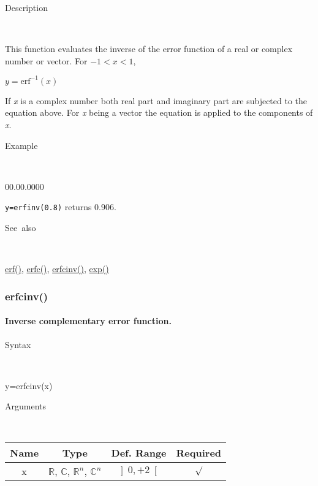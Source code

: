 \begin{description}
\item [Description]~
\end{description}
This function evaluates the inverse of the error function of a real
or complex number or vector. For $-1<x<1$,

\medskip{}
$y=\mathit{\mathrm{erf^{-1}}}(x)$
\medskip{}

\noindent If \textit{x} is a complex number both real part and imaginary
part are subjected to the equation above. For \textit{x} being a vector
the equation is applied to the components of \textit{x}.

\begin{description}
\item [Example]~
\end{description}
\begin{lyxlist}{00.00.0000}
\item [\texttt{y=erfinv(0.8)}]returns 0.906.
\end{lyxlist}
\begin{description}
\item [See~also]~
\end{description}
\textcolor{blue}{\hyperlink{erf}{erf()}}\textcolor{black}{,} \textcolor{blue}{\hyperlink{erfc}{erfc()}}\textcolor{black}{,}
\textcolor{blue}{\hyperlink{erfcinv}{erfcinv()}}\textcolor{black}{,}
\textcolor{blue}{\hyperlink{exp}{exp()}}


\newpage
\subsubsection*{\hypertarget{erfcinv}{}{\Large erfcinv()}}


\paragraph{\label{par:Inverse-complementary-error}Inverse complementary error
function.}

\begin{description}
\item [Syntax]~
\end{description}
y=erfcinv(x)

\begin{description}
\item [Arguments]~
\end{description}
\begin{tabular}{|c|c|c|c|}
\hline 
Name&
Type&
Def. Range&
Required\tabularnewline
\hline
\hline 
x&
$\mathbb{R}$, $\mathbb{C}$, $\mathbb{R}^{n}$, $\mathbb{C}^{n}$&
$\left]0,+2\right[$&
$\surd$\tabularnewline
\hline
\end{tabular}

